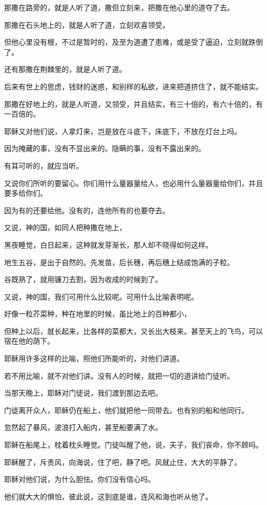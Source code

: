 \documentclass[12pt,oneside]{book}
\begin{document}
那撒在路旁的，就是人听了道，撒但立刻来，把撒在他心里的道夺了去。

那撒在石头地上的，就是人听了道，立刻欢喜领受。

但他心里没有根，不过是暂时的，及至为道遭了患难，或是受了逼迫，立刻就跌倒了。

还有那撒在荆棘里的，就是人听了道。

后来有世上的思虑，钱财的迷惑，和别样的私欲，进来把道挤住了，就不能结实。

那撒在好地上的，就是人听道，又领受，并且结实，有三十倍的，有六十倍的，有一百倍的。

耶稣又对他们说，人拿灯来，岂是放在斗底下，床底下，不放在灯台上吗。

因为掩藏的事，没有不显出来的。隐瞒的事，没有不露出来的。

有耳可听的，就应当听。

又说你们所听的要留心。你们用什么量器量给人，也必用什么量器量给你们，并且要多给你们。

因为有的还要给他。没有的，连他所有的也要夺去。

又说，神的国，如同人把种撒在地上，

黑夜睡觉，白日起来，这种就发芽渐长，那人却不晓得如何这样。

地生五谷，是出于自然的。先发苗，后长穗，再后穗上结成饱满的子粒。

谷既熟了，就用镰刀去割，因为收成的时候到了。

又说，神的国，我们可用什么比较呢。可用什么比喻表明呢。

好像一粒芥菜种，种在地里的时候，虽比地上的百种都小，

但种上以后，就长起来，比各样的菜都大，又长出大枝来。甚至天上的飞鸟，可以宿在他的荫下。

耶稣用许多这样的比喻，照他们所能听的，对他们讲道。

若不用比喻，就不对他们讲。没有人的时候，就把一切的道讲给门徒听。

当那天晚上，耶稣对门徒说，我们渡到那边去吧。

门徒离开众人，耶稣仍在船上，他们就把他一同带去。也有别的船和他同行。

忽然起了暴风，波浪打入船内，甚至船要满了水。

耶稣在船尾上，枕着枕头睡觉。门徒叫醒了他，说，夫子，我们丧命，你不顾吗。

耶稣醒了，斥责风，向海说，住了吧，静了吧。风就止住，大大的平静了。

耶稣对他们说，为什么胆怯。你们没有信心吗。

他们就大大的惧怕，彼此说，这到底是谁，连风和海也听从他了。
\end{document}
